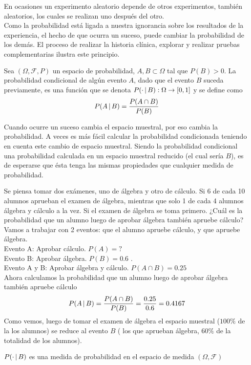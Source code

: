 En ocasiones un experimento aleatorio depende de otros experimentos, también aleatorios, los cuales se realizan uno después del otro.\\
Como la probabilidad está ligada a nuestra ignorancia sobre los resultados de la experiencia, el hecho de que ocurra un suceso, puede cambiar la probabilidad de los demás. El proceso de realizar la historia clínica, explorar y realizar pruebas complementarias ilustra este principio.
\begin{Def}
    Sea $(\Omega,\mathscr{F},P)$ un espacio de probabilidad, $A,B\subset\Omega$ tal que $P(B)>0$. La probabilidad condicional de algún evento $A$, dado que el evento $B$ suceda previamente, es una función que se denota $P(\cdot\thinspace|\thinspace B):\Omega\rightarrow [0,1]$ y se define como $$P(A\thinspace|\thinspace B)=\frac{P(A\cap B)}{P(B)}$$
\end{Def}
Cuando ocurre un suceso cambia el espacio muestral, por eso cambia la probabilidad. A veces es más fácil calcular la probabilidad condicionada teniendo en cuenta este cambio de espacio muestral. 
    Siendo la probabilidad condicional una probabilidad calculada en un espacio muestral reducido (el cual sería $B$), es de esperarse que ésta tenga las mismas propiedades que cualquier medida de probabilidad.
\begin{Ejm}
Se piensa tomar dos exámenes, uno de álgebra y otro de cálculo.
   Si 6 de cada 10 alumnos aprueban el examen de álgebra, mientras que solo 1 de cada 4 alumnos  álgebra y cálculo a la vez. Si el examen de álgebra se toma primero. ¿Cuál es la probabilidad que un alumno luego de aprobar álgebra también apruebe cálculo?
    Vamos a trabajar con 2 eventos: que el alumno apruebe cálculo, y que apruebe álgebra.\\
    Evento A: Aprobar cálculo. $P(A) = ?$\\
    Evento B: Aprobar álgebra. $P(B) =0.6$ .\\
    Evento A y B: Aprobar álgebra y cálculo. $P(A\cap B) =0.25$\\
    Ahora calculamos la probabilidad que un alumno luego de aprobar álgebra también apruebe cálculo
    $$P(A\thinspace|\thinspace B)=\frac{P(A\cap B)}{P(B)}=\frac{0.25}{0.6}=0.4167$$
   Como vemos, luego de tomar el examen de álgebra el espacio muestral ($100\%$ de la los alumnos) se reduce al evento $B$ ( los que aprueban álgebra, $60 \%$ de la totalidad de los alumnos).
  \end{Ejm}
\begin{Prop}
    $P(\cdot\thinspace|\thinspace B)$ es una medida de probabilidad en el espacio de medida $(\Omega,\mathscr{F})$
\end{Prop}
